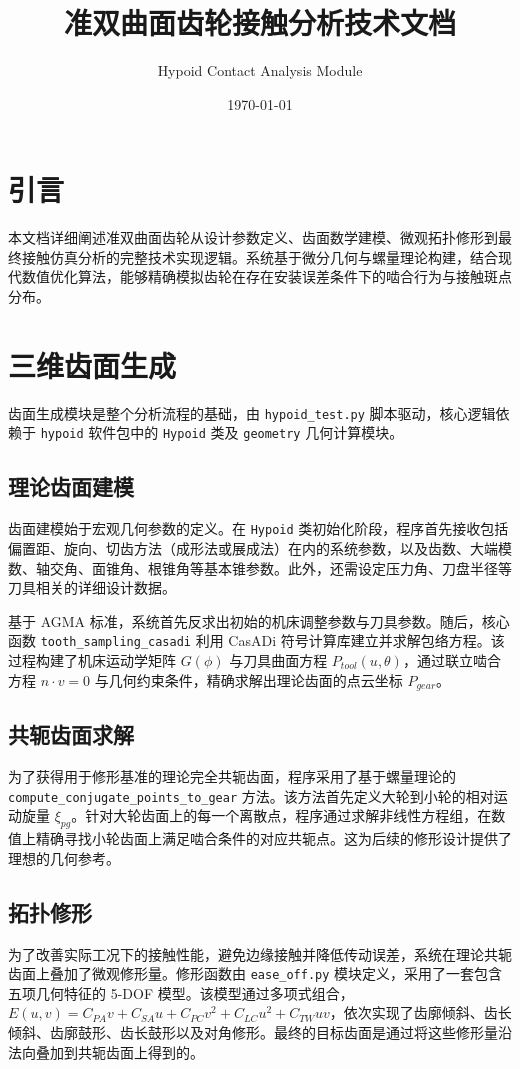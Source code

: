 \documentclass[UTF8]{ctexart}
\title{准双曲面齿轮接触分析技术文档}
\author{Hypoid Contact Analysis Module}
\date{\today}
\begin{document}
\maketitle

\tableofcontents
\newpage

\section{引言}
本文档详细阐述准双曲面齿轮从设计参数定义、齿面数学建模、微观拓扑修形到最终接触仿真分析的完整技术实现逻辑。系统基于微分几何与螺量理论构建，结合现代数值优化算法，能够精确模拟齿轮在存在安装误差条件下的啮合行为与接触斑点分布。

\section{三维齿面生成}
齿面生成模块是整个分析流程的基础，由 \texttt{hypoid\_test.py} 脚本驱动，核心逻辑依赖于 \texttt{hypoid} 软件包中的 \texttt{Hypoid} 类及 \texttt{geometry} 几何计算模块。

\subsection{理论齿面建模}
齿面建模始于宏观几何参数的定义。在 \texttt{Hypoid} 类初始化阶段，程序首先接收包括偏置距、旋向、切齿方法（成形法或展成法）在内的系统参数，以及齿数、大端模数、轴交角、面锥角、根锥角等基本锥参数。此外，还需设定压力角、刀盘半径等刀具相关的详细设计数据。

基于 AGMA 标准，系统首先反求出初始的机床调整参数与刀具参数。随后，核心函数 \texttt{tooth\_sampling\_casadi} 利用 CasADi 符号计算库建立并求解包络方程。该过程构建了机床运动学矩阵 $G(\phi)$ 与刀具曲面方程 $P_{tool}(u, \theta)$，通过联立啮合方程 $n \cdot v = 0$ 与几何约束条件，精确求解出理论齿面的点云坐标 $P_{gear}$。

\subsection{共轭齿面求解}
为了获得用于修形基准的理论完全共轭齿面，程序采用了基于螺量理论的 \texttt{compute\_conjugate\_points\_to\_gear} 方法。该方法首先定义大轮到小轮的相对运动旋量 $\xi_{pg}$。针对大轮齿面上的每一个离散点，程序通过求解非线性方程组，在数值上精确寻找小轮齿面上满足啮合条件的对应共轭点。这为后续的修形设计提供了理想的几何参考。

\subsection{拓扑修形}
为了改善实际工况下的接触性能，避免边缘接触并降低传动误差，系统在理论共轭齿面上叠加了微观修形量。修形函数由 \texttt{ease\_off.py} 模块定义，采用了一套包含五项几何特征的 5-DOF 模型。该模型通过多项式组合，$E(u, v) = C_{PA} v + C_{SA} u + C_{PC} v^2 + C_{LC} u^2 + C_{TW} uv$，依次实现了齿廓倾斜、齿长倾斜、齿廓鼓形、齿长鼓形以及对角修形。最终的目标齿面是通过将这些修形量沿法向叠加到共轭齿面上得到的。
\end{document}
